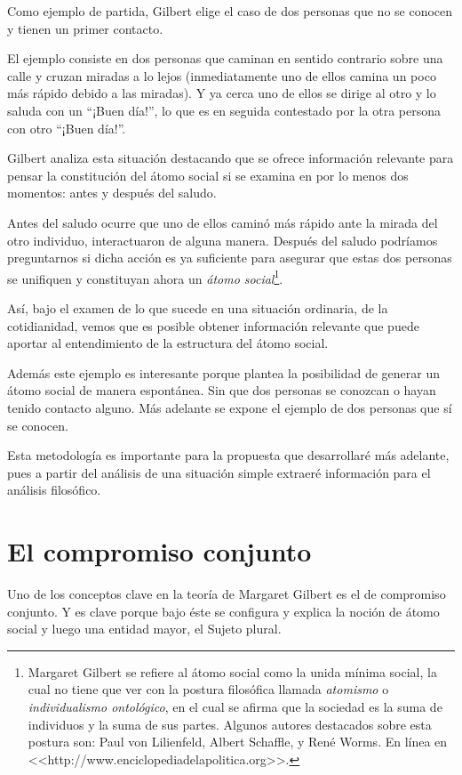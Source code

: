 \documentclass[oneside]{book}
\begin{document}
Como ejemplo de partida, Gilbert elige el caso de dos personas que no se conocen y tienen un primer contacto.

El ejemplo consiste en dos personas que caminan en sentido contrario sobre una calle y cruzan miradas a lo lejos (inmediatamente uno de ellos camina un poco más rápido debido a las miradas). Y ya cerca uno de ellos se dirige al otro y lo saluda con un “¡Buen día!”, lo que es en seguida contestado por la otra persona con otro “¡Buen día!”.

Gilbert analiza esta situación destacando que se ofrece información relevante para pensar la constitución del átomo social si se examina en por lo menos dos momentos: antes y después del saludo.

Antes del saludo ocurre que uno de ellos caminó más rápido ante la mirada del otro individuo, interactuaron de alguna manera. Después del saludo podríamos preguntarnos si dicha acción es ya suficiente para asegurar que estas dos personas se unifiquen y constituyan ahora un \textit{átomo social}\footnote{Margaret Gilbert se refiere al átomo social como la unida mínima social, la cual no tiene que ver con la postura filosófica llamada \textit{atomismo} o \textit{individualismo ontológico}, en el cual se afirma que la sociedad es la suma de individuos y la suma de sus partes. Algunos autores destacados sobre esta postura son: Paul von Lilienfeld, Albert Schaffle, y René Worms. En línea en <<http://www.enciclopediadelapolitica.org>>.}.

Así, bajo el examen de lo que sucede en una situación ordinaria, de la cotidianidad, vemos que es posible obtener información relevante que puede aportar al entendimiento de la estructura del átomo social.

Además este ejemplo es interesante porque plantea la posibilidad de generar un átomo social de manera espontánea. Sin que dos personas se conozcan o hayan tenido contacto alguno. Más adelante se expone el ejemplo de dos personas que sí se conocen.

Esta metodología es importante para la propuesta que desarrollaré más adelante, pues a partir del análisis de una situación simple extraeré información para el análisis filosófico.

\section{El compromiso conjunto}

Uno de los conceptos clave en la teoría de Margaret Gilbert es el de compromiso conjunto. Y es clave porque bajo éste se configura y explica la noción de átomo social y luego una entidad mayor, el Sujeto plural.
	
\end{document}
